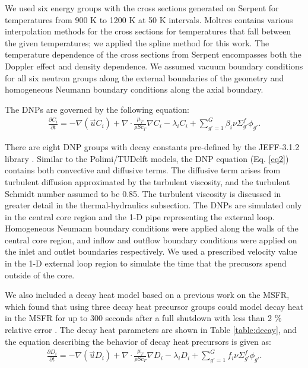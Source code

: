 We used six energy groups with the cross sections generated on Serpent for
temperatures from 900 K to 1200 K at 50 K intervals. Moltres contains various
interpolation methods for the cross sections for temperatures that fall
between the given temperatures; we applied the spline method for this work.
The temperature dependence of the cross sections from Serpent encompasses both
the Doppler effect and density dependence. We assumed vacuum boundary
conditions for all six neutron groups along the external boundaries of the
geometry and homogeneous Neumann boundary conditions along the axial boundary.

The \glspl{DNP} are governed by the following equation:
%
\begin{align}
	\frac{\partial C_i}{\partial t} = - \nabla(\overrightarrow{u} C_i)
	+ \nabla \cdot \frac{\mu_T}{\rho Sc_T} \nabla C_i	
	- \lambda_i C_i + \sum^G_{g'=1} \beta_i \nu \Sigma^f_{g'}
	\phi_{g'}. \label{eq2}
\end{align}

There are eight \gls{DNP} groups with decay constants pre-defined by the
JEFF-3.1.2 library \cite{oecd/nea_jeff-3.1.2_2014}. Similar to the
Polimi/TUDelft models, the \gls{DNP} equation (Eq. \ref{eq2}) contains both
convective and diffusive terms. The diffusive term arises from turbulent
diffusion approximated by the turbulent viscosity, and the turbulent Schmidt
number assumed to be 0.85. The turbulent viscosity is discussed in greater
detail in the thermal-hydraulics subsection. The \glspl{DNP} are simulated
only in the central core region and the 1-D pipe representing the external
loop. Homogeneous Neumann boundary conditions were applied along the walls of
the central core region, and inflow and outflow boundary conditions were
applied on the inlet and outlet boundaries respectively. We used a prescribed
velocity value in the 1-D external loop region to simulate the time that the
precusors spend outside of the core.

We also included a decay heat model based on a previous work
\cite{aufiero_extended_2013} on the \gls{MSFR}, which found that using three
decay heat precursor groups could model decay heat in the \gls{MSFR} for up to
300 seconds after a full shutdown with less than 2 \% relative error
\cite{aufiero_development_2014}. The decay heat parameters are shown in Table
\ref{table:decay}, and the equation describing the behavior of decay heat
precursors is given as:
%
\begin{align}
	\frac{\partial D_i}{\partial t} = - \nabla(\overrightarrow{u} D_i)
	+ \nabla \cdot \frac{\mu_T}{\rho Sc_T} \nabla D_i	
	- \lambda_i D_i + \sum^G_{g'=1} f_i \nu \Sigma^f_{g'}
	\phi_{g'}. \label{eq2}
\end{align}


